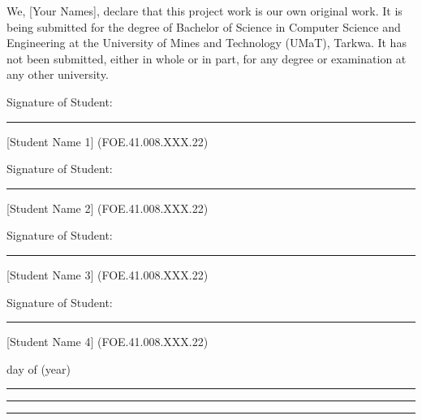 
\vspace{-20pt}
\begin{declaration}
	\addchaptertocentry{\authorshipname}

	We, [Your Names], declare that this project work is our own original work. It is being submitted for the degree of Bachelor of Science in Computer Science and Engineering at the University of Mines and Technology (UMaT), Tarkwa. It has not been submitted, either in whole or in part, for any degree or examination at any other university.

	\vspace{20pt}

	Signature of Student: \hspace{1.5cm} \rule{9cm}{0.5pt}

	[Student Name 1] (FOE.41.008.XXX.22)

	\vspace{10pt}

	Signature of Student: \hspace{1.5cm} \rule{9cm}{0.5pt}

	[Student Name 2] (FOE.41.008.XXX.22)

	\vspace{10pt}

	Signature of Student: \hspace{1.5cm} \rule{9cm}{0.5pt}

	[Student Name 3] (FOE.41.008.XXX.22)

	\vspace{10pt}

	Signature of Student: \hspace{1.5cm} \rule{9cm}{0.5pt}

	[Student Name 4] (FOE.41.008.XXX.22)

	\vspace{1.5cm}

	\hspace{5.3em} day of\vspace{-10pt} \hspace{9em} (year)\vspace{-5pt}

	\noindent \rule[0.5em]{5em}{0.5pt} \hspace{3.5em} \rule[0.5em]{8em}{0.5pt} \hspace{3.2em} \rule[0.5em]{5em}{0.5pt}
\end{declaration}
